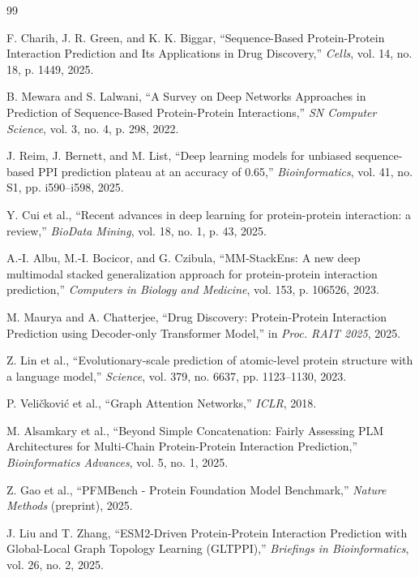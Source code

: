 \documentclass[12pt,a4paper]{report}
\begin{document}
\newpage
\pagestyle{plain}
\renewcommand{\bibname}{References}
\begin{thebibliography}{99}

F. Charih, J. R. Green, and K. K. Biggar, ``Sequence-Based Protein-Protein Interaction Prediction and Its Applications in Drug Discovery,'' \textit{Cells}, vol. 14, no. 18, p. 1449, 2025.

B. Mewara and S. Lalwani, ``A Survey on Deep Networks Approaches in Prediction of Sequence-Based Protein-Protein Interactions,'' \textit{SN Computer Science}, vol. 3, no. 4, p. 298, 2022.

J. Reim, J. Bernett, and M. List, ``Deep learning models for unbiased sequence-based PPI prediction plateau at an accuracy of 0.65,'' \textit{Bioinformatics}, vol. 41, no. S1, pp. i590--i598, 2025.

Y. Cui et al., ``Recent advances in deep learning for protein-protein interaction: a review,'' \textit{BioData Mining}, vol. 18, no. 1, p. 43, 2025.

A.-I. Albu, M.-I. Bocicor, and G. Czibula, ``MM-StackEns: A new deep multimodal stacked generalization approach for protein-protein interaction prediction,'' \textit{Computers in Biology and Medicine}, vol. 153, p. 106526, 2023.

M. Maurya and A. Chatterjee, ``Drug Discovery: Protein-Protein Interaction Prediction using Decoder-only Transformer Model,'' in \textit{Proc. RAIT 2025}, 2025.

Z. Lin et al., ``Evolutionary-scale prediction of atomic-level protein structure with a language model,'' \textit{Science}, vol. 379, no. 6637, pp. 1123--1130, 2023.

P. Veli\v{c}kovi\'{c} et al., ``Graph Attention Networks,'' \textit{ICLR}, 2018.

M. Alsamkary et al., ``Beyond Simple Concatenation: Fairly Assessing PLM Architectures for Multi-Chain Protein-Protein Interaction Prediction,'' \textit{Bioinformatics Advances}, vol. 5, no. 1, 2025.

Z. Gao et al., ``PFMBench - Protein Foundation Model Benchmark,'' \textit{Nature Methods} (preprint), 2025.

J. Liu and T. Zhang, ``ESM2-Driven Protein-Protein Interaction Prediction with Global-Local Graph Topology Learning (GLTPPI),'' \textit{Briefings in Bioinformatics}, vol. 26, no. 2, 2025.

\end{thebibliography}
\end{document}
